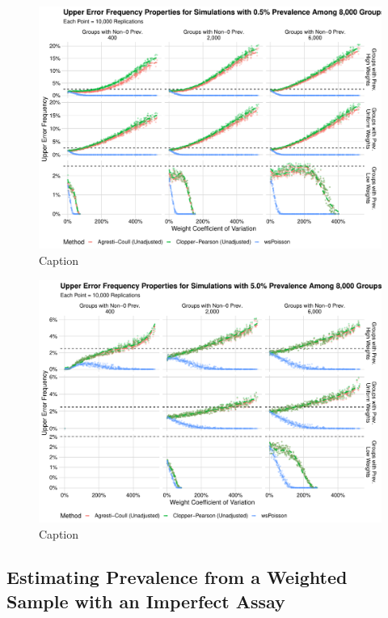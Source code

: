 \documentclass[AMA,STIX1COL]{WileyNJD-v2}
\begin{document}
\begin{figure}
    \centering
    \includegraphics[width=\textwidth]{figures/perfect_upper_error_frequency_8000_0_005_reduced.pdf}
    \caption{Caption}
    \label{fig:perfect_upper_error_frequency_8000_0_005_reduced}
\end{figure}

\begin{figure}
    \centering
    \includegraphics[width=\textwidth]{figures/perfect_upper_error_frequency_8000_0_05_reduced.pdf}
    \caption{Caption}
    \label{fig:perfect_upper_error_frequency_8000_0_05_reduced.pdf}
\end{figure}

\subsection{Estimating Prevalence from a Weighted Sample with an  Imperfect Assay}
\end{document}
